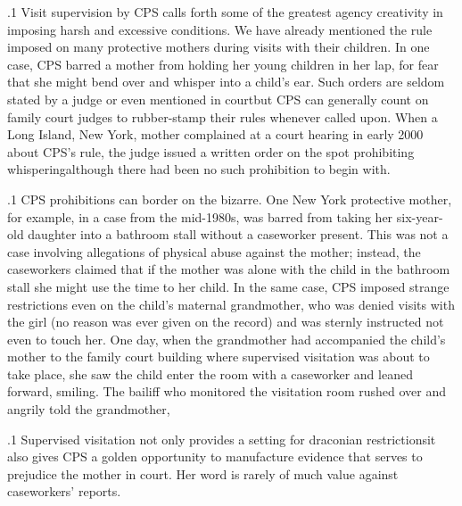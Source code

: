 \documentclass[11pt, twoside]{article}
\begin{document}
{\p.1{%
Visit supervision by CPS calls forth some of the greatest agency creativity in imposing harsh and excessive conditions. We have already
mentioned the  rule imposed on many protective mothers during visits with their children. In one case, CPS barred a mother
from holding her young children in her lap, for fear that she might bend
over and whisper into a child's ear. Such orders are seldom stated by
a judge or even mentioned in court\mdash{}but CPS can generally count on
family court judges to rubber-stamp their rules whenever called upon.
When a Long Island, New York, mother complained at a court hearing
in early 2000 about CPS's  rule, the judge issued a written order on the spot prohibiting whispering\mdash{}although there had been
no such prohibition to begin with.
}%

\p.1{%
CPS prohibitions can border on the bizarre. One New York protective mother, for example, in a case from the mid-1980s, was barred
from taking her six-year-old daughter into a bathroom stall without a
caseworker present. This was not a case involving allegations of physical
abuse against the mother; instead, the caseworkers claimed that if the
mother was alone with the child in the bathroom stall she might use the
 time to  her child. In the same case, CPS imposed
strange restrictions even on the child's maternal grandmother, who was
denied visits with the girl (no reason was ever given on the record) and
was sternly instructed not even to touch her. One day, when the grandmother had accompanied the child's mother to the family court building
where supervised visitation was about to take place, she saw the child enter the room with a caseworker and leaned forward, smiling. The bailiff
who monitored the visitation room rushed over and angrily told the
grandmother, 
}%

\p.1{%
Supervised visitation not only provides a setting for draconian
restric\-tions\mdash{}it also gives CPS a golden opportunity to manufacture
evidence that serves to prejudice the mother in court. Her word
is rarely of much value against caseworkers' reports.
}%

}
\end{document}
